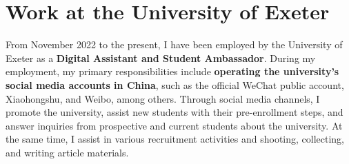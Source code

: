 \section{Work at the University of Exeter}

From November 2022 to the present, I have been employed by the University of Exeter as a \textbf{Digital Assistant and Student Ambassador}. During my employment, my primary responsibilities include \textbf{operating the university's social media accounts in China}, such as the official WeChat public account, Xiaohongshu, and Weibo, among others. Through social media channels, I promote the university, assist new students with their pre-enrollment steps, and answer inquiries from prospective and current students about the university. At the same time, I assist in various recruitment activities and shooting, collecting, and writing article materials. 

